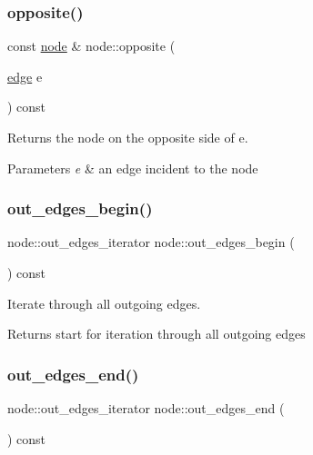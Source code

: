 \subsubsection{\texorpdfstring{opposite()}{opposite()}}
{\footnotesize\ttfamily const \mbox{\hyperlink{classnode}{node}} \& node\+::opposite (\begin{DoxyParamCaption}\item[{\mbox{\hyperlink{classedge}{edge}}}]{e }\end{DoxyParamCaption}) const}

Returns the node on the opposite side of {\ttfamily e}.


\begin{DoxyParams}{Parameters}
{\em e} & an edge incident to the node \\
\hline
\end{DoxyParams}
\mbox{\label{classnode_a7dcb80df22118cea04f77ca8c952d9c2}} 
\subsubsection{\texorpdfstring{out\+\_\+edges\+\_\+begin()}{out\_edges\_begin()}}
{\footnotesize\ttfamily node\+::out\+\_\+edges\+\_\+iterator node\+::out\+\_\+edges\+\_\+begin (\begin{DoxyParamCaption}{ }\end{DoxyParamCaption}) const}

Iterate through all outgoing edges.

\begin{DoxyReturn}{Returns}
start for iteration through all outgoing edges 
\end{DoxyReturn}
\mbox{\label{classnode_a7ce2ba5195a63d4df6b44299a02a9378}} 
\subsubsection{\texorpdfstring{out\+\_\+edges\+\_\+end()}{out\_edges\_end()}}
{\footnotesize\ttfamily node\+::out\+\_\+edges\+\_\+iterator node\+::out\+\_\+edges\+\_\+end (\begin{DoxyParamCaption}{ }\end{DoxyParamCaption}) const}


